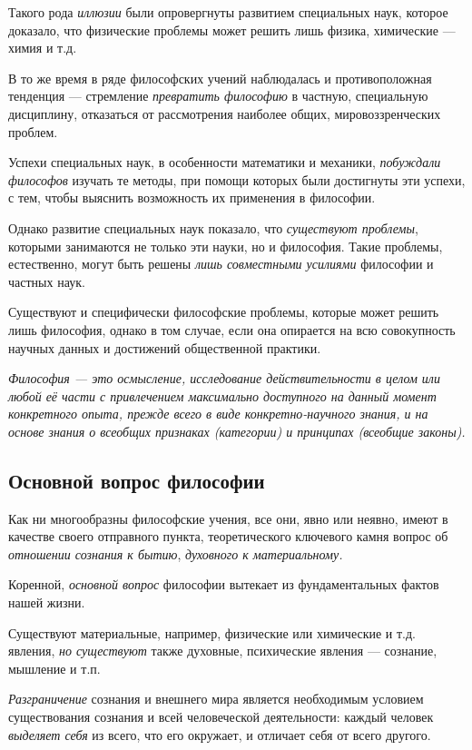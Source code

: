 \documentclass[a4paper,14pt,russian]{extreport}
\begin{document}
Такого рода \emph{иллюзии} были опровергнуты развитием специальных наук, которое доказало, что физические проблемы может решить лишь физика, химические --- химия и т.д.

В то же время в ряде философских учений наблюдалась и противоположная тенденция --- стремление \emph{превратить философию} в частную, специальную дисциплину, отказаться от рассмотрения наиболее общих, мировоззренческих проблем.

Успехи специальных наук, в особенности математики и механики, \emph{побуждали философов} изучать те методы, при помощи которых были достигнуты эти успехи, с тем, чтобы выяснить возможность их применения в философии.

Однако развитие специальных наук показало, что \emph{существуют проблемы}, которыми занимаются не только эти науки, но и философия. Такие проблемы, естественно, могут быть решены \emph{лишь совместными усилиями} философии и частных наук.

Существуют и специфически философские проблемы, которые может решить лишь философия, однако в том случае, если она опирается на всю совокупность научных данных и достижений общественной практики.

\emph{Философия --- это осмысление, исследование действительности в целом или любой её части с привлечением максимально доступного на данный момент конкретного опыта, прежде всего в виде конкретно-научного знания, и на основе знания о всеобщих признаках (категории) и принципах (всеобщие законы).}

\subsection{Основной вопрос философии}

Как ни многообразны философские учения, все они, явно или неявно, имеют в качестве своего отправного пункта, теоретического ключевого камня вопрос об \emph{отношении сознания к бытию}, \emph{духовного к материальному.}

Коренной, \emph{основной вопрос} философии вытекает из фундаментальных фактов нашей жизни.

Существуют материальные, например, физические или химические и т.д. явления, \emph{но существуют} также духовные, психические явления --- сознание, мышление и т.п.

\emph{Разграничение} сознания и внешнего мира является необходимым условием существования сознания и всей человеческой деятельности: каждый человек \emph{выделяет себя} из всего, что его окружает, и отличает себя от всего другого.
\end{document}
